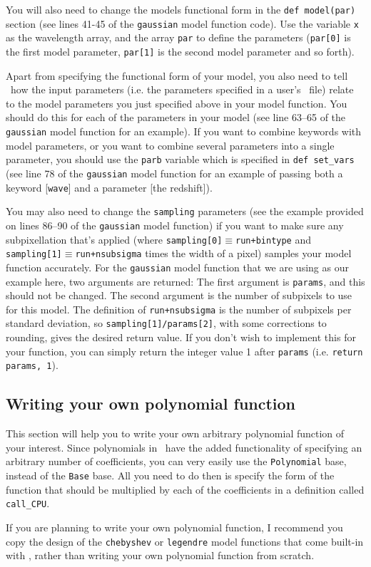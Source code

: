 You will also need to change the models functional form
in the \texttt{def model(par)} section (see lines 41-45 of
the \texttt{gaussian} model function code). Use the variable
\texttt{x} as the wavelength array, and the array \texttt{par}
to define the parameters (\texttt{par[0]} is the first model
parameter, \texttt{par[1]} is the second model parameter
and so forth).

Apart from specifying the functional form of your model, you also
need to tell \alis\ how the input parameters (i.e. the parameters
specified in a user's \dmod\ file) relate to the model parameters
you just specified above in your model function. You should do
this for each of the parameters in your model (see line 63--65
of the \texttt{gaussian} model function for an example).
If you want to combine keywords with model parameters, or you
want to combine several parameters into a single parameter, you
should use the \texttt{parb} variable which is specified in
\texttt{def set\_vars} (see line 78 of the \texttt{gaussian} model
function for an example of passing both a keyword [\texttt{wave}]
and a parameter [the redshift]).

You may also need to change the \texttt{sampling} parameters (see
the example provided on lines 86--90 of the \texttt{gaussian} model
function) if you want to make sure any subpixellation that's applied
(where \texttt{sampling[0]}$\equiv$\texttt{run+bintype} and
\texttt{sampling[1]}$\equiv$\texttt{run+nsubsigma} times the width of a pixel) samples your
model function accurately. For the \texttt{gaussian} model function
that we are using as our example here, two arguments are returned:
The first argument is \texttt{params}, and this should not be changed.
The second argument is the number of subpixels to use for this model.
The definition of \texttt{run+nsubsigma} is the number of subpixels per
standard deviation, so \texttt{sampling[1]/params[2]}, with some corrections
to rounding, gives the desired return value. If you don't wish to implement
this for your function, you can simply return the integer value 1 after
\texttt{params} (i.e. \texttt{return params, 1}).

\subsection{Writing your own polynomial function}
\label{sec:wrtpoly}

This section will help you to write your own arbitrary
polynomial function of your interest. Since polynomials
in \alis\ have the added functionality of specifying
an arbitrary number of coefficients, you can very easily
use the \texttt{Polynomial} base, instead of the \texttt{Base}
base.  All you need to do then is specify the form of the
function that should be multiplied by each of the coefficients
in a definition called \texttt{call\_CPU}.

If you are planning to write your own polynomial function,
I recommend you copy the design of the \texttt{chebyshev}
or \texttt{legendre} model functions that come built-in with \alis,
rather than writing your own polynomial function from scratch.
